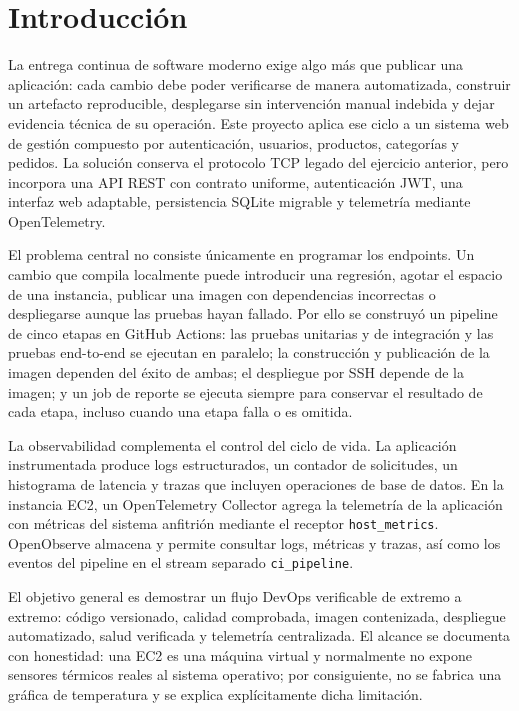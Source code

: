 \documentclass[12pt,a4paper]{article}
\begin{document}
\clearpage
{}
\tableofcontents
\clearpage
\listoffigures
\clearpage
\listoftables
\clearpage
{}

\section{Introducción}

La entrega continua de software moderno exige algo más que publicar una aplicación: cada cambio debe poder verificarse de manera automatizada, construir un artefacto reproducible, desplegarse sin intervención manual indebida y dejar evidencia técnica de su operación. Este proyecto aplica ese ciclo a un sistema web de gestión compuesto por autenticación, usuarios, productos, categorías y pedidos. La solución conserva el protocolo TCP legado del ejercicio anterior, pero incorpora una API REST con contrato uniforme, autenticación JWT, una interfaz web adaptable, persistencia SQLite migrable y telemetría mediante OpenTelemetry.

El problema central no consiste únicamente en programar los endpoints. Un cambio que compila localmente puede introducir una regresión, agotar el espacio de una instancia, publicar una imagen con dependencias incorrectas o despliegarse aunque las pruebas hayan fallado. Por ello se construyó un pipeline de cinco etapas en GitHub Actions: las pruebas unitarias y de integración y las pruebas end-to-end se ejecutan en paralelo; la construcción y publicación de la imagen dependen del éxito de ambas; el despliegue por SSH depende de la imagen; y un job de reporte se ejecuta siempre para conservar el resultado de cada etapa, incluso cuando una etapa falla o es omitida.

La observabilidad complementa el control del ciclo de vida. La aplicación instrumentada produce logs estructurados, un contador de solicitudes, un histograma de latencia y trazas que incluyen operaciones de base de datos. En la instancia EC2, un OpenTelemetry Collector agrega la telemetría de la aplicación con métricas del sistema anfitrión mediante el receptor \texttt{host\_metrics}. OpenObserve almacena y permite consultar logs, métricas y trazas, así como los eventos del pipeline en el stream separado \texttt{ci\_pipeline}.

El objetivo general es demostrar un flujo DevOps verificable de extremo a extremo: código versionado, calidad comprobada, imagen contenizada, despliegue automatizado, salud verificada y telemetría centralizada. El alcance se documenta con honestidad: una EC2 es una máquina virtual y normalmente no expone sensores térmicos reales al sistema operativo; por consiguiente, no se fabrica una gráfica de temperatura y se explica explícitamente dicha limitación.
\end{document}
